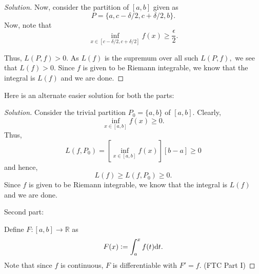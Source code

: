 \documentclass[12pt]{article}
\theoremstyle{definition}
\newenvironment{soln}{\begin{proof}[Solution]}{\end{proof}}
\begin{document}
\begin{itemize}
\begin{itemize}
\begin{soln}
			Now, consider the partition of $[a, b]$ given as
			\begin{equation*} 
				P = \{a, c - \delta/2, c + \delta/2, b\}.
			\end{equation*}
			Now, note that
			\begin{equation*} 
				\inf_{x \in [c - \delta/2, c + \delta/2]} f(x) \ge \dfrac{\epsilon}{2}.
			\end{equation*}

			Thus, $L(P, f) > 0.$ As $L(f)$ is the supremum over all such $L(P, f),$ we see that $L(f) > 0.$ Since $f$ is given to be Riemann integrable, we know that the integral is $L(f)$ and we are done.
		\end{soln}

		{\color{myupdatecolor}Here is an alternate easier solution for both the parts:}

		\begin{soln}
			Consider the trivial partition $P_0 = \{a, b\}$ of $[a, b].$ Clearly,
			\begin{equation*} 
				\inf_{x \in [a, b]} f(x) \ge 0.	
			\end{equation*}
			Thus,
			\begin{equation*} 
				L(f, P_0) = \left[\inf_{x \in [a, b]} f(x)\right][b - a] \ge 0
			\end{equation*}
			and hence,
			\begin{equation*} 
				L(f) \ge L(f, P_0) \ge 0.
			\end{equation*}
			Since $f$ is given to be Riemann integrable, we know that the integral is $L(f)$ and we are done.
			
			\hrulefill
			
			Second part:

			Define $F:[a, b] \to \mathbb{R}$ as
			\begin{equation*} 
				F(x) \vcentcolon= \int_{a}^{x} f(t) {\mathrm{d}}t.
			\end{equation*}
			Note that since $f$ is continuous, $F$ is differentiable with $F' = f.$ (FTC Part I)


\end{soln}
\end{itemize}
\end{itemize}
\end{document}
